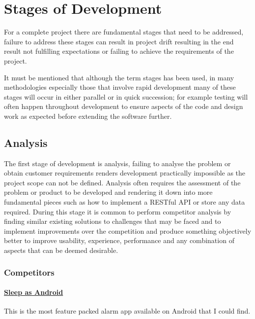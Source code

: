 \section{Stages of Development}\label{stages-of-development}

For a complete project there are fundamental stages that need to be
addressed, failure to address these stages can result in project drift
resulting in the end result not fulfilling expectations or failing to
achieve the requirements of the project.

It must be mentioned that although the term stages has been used, in
many methodologies especially those that involve rapid development many
of these stages will occur in either parallel or in quick succession;
for example testing will often happen throughout development to ensure
aspects of the code and design work as expected before extending the
software further.

\subsection{Analysis}\label{analysis}

The first stage of development is analysis, failing to analyse the
problem or obtain customer requirements renders development practically
impossible as the project scope can not be defined. Analysis often
requires the assessment of the problem or product to be developed and
rendering it down into more fundamental pieces such as how to implement
a RESTful API or store any data required. During this stage it is common
to perform competitor analysis by finding similar existing solutions to
challenges that may be faced and to implement improvements over the
competition and produce something objectively better to improve
usability, experience, performance and any combination of aspects that
can be deemed desirable.

\subsubsection{Competitors}\label{competitors}

\paragraph{\texorpdfstring{\href{http://sleep.urbandroid.org/}{Sleep as
Android}}{Sleep as Android}}\label{sleep-as-android}

This is the most feature packed alarm app available on Android that I
could find.

